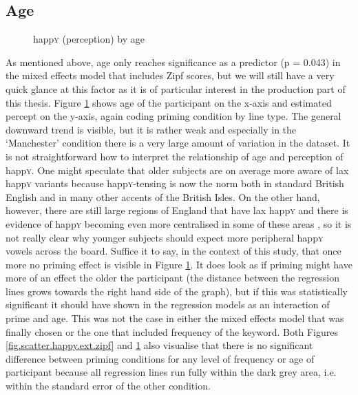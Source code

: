 \subsection{Age}
\label{sec.perc_res.happy.age}

\begin{figure}[h]
	\centering
		\resizebox{.49\linewidth}{!}{} 
	\caption{happ\textsc{y} (perception) by age}
	\label{fig.scatter.happy.ext.age}
\end{figure}

As mentioned above, age only reaches significance as a predictor (p = 0.043) in the mixed effects model that includes Zipf scores, but we will still have a very quick glance at this factor as it is of particular interest in the production part of this thesis.
Figure \ref{fig.scatter.happy.ext.age} shows age of the participant on the x-axis and estimated percept on the y-axis, again coding priming condition by line type.
The general downward trend is visible, but it is rather weak and especially in the `Manchester' condition there is a very large amount of variation in the dataset.
It is not straightforward how to interpret the relationship of age and perception of happ\textsc{y}.
One might speculate that older subjects are on average more aware of lax happ\textsc{y} variants because happ\textsc{y}-tensing is now the norm both in standard British English and in many other accents of the British Isles.
On the other hand, however, there are still large regions of England that have lax happ\textsc{y} and there is evidence of happ\textsc{y} becoming even more centralised in some of these areas \parencite[cf.][]{flynn2010}, so it is not really clear why younger subjects should expect more peripheral happ\textsc{y} vowels across the board.
Suffice it to say, in the context of this study, that once more no priming effect is visible in Figure \ref{fig.scatter.happy.ext.age}.
It does look as if priming might have more of an effect the older the participant (the distance between the regression lines grows towards the right hand side of the graph), but if this was statistically significant it should have shown in the regression models as an interaction of prime and age.
This was not the case in either the mixed effects model that was finally chosen or the one that included frequency of the keyword.
Both Figures \ref{fig.scatter.happy.ext.zipf} and \ref{fig.scatter.happy.ext.age} also visualise that there is no significant difference between priming conditions for any level of frequency or age of participant because all regression lines run fully within the dark grey area, i.e. within the standard error of the other condition.

